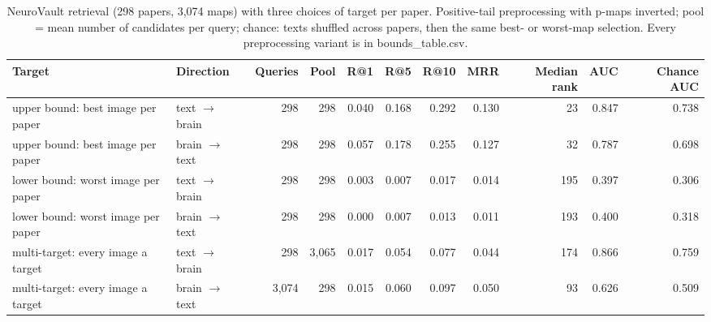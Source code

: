 \begin{table}[ht]
\centering
\scriptsize
\caption{NeuroVault retrieval (298 papers, 3,074 maps) with three choices of target per paper. Positive-tail preprocessing with p-maps inverted; pool = mean number of candidates per query; chance: texts shuffled across papers, then the same best- or worst-map selection. Every preprocessing variant is in bounds\_table.csv.}
\label{tab:neurovault_bounds}
\begin{tabular}{llrrrrrrrrr}
\toprule
Target & Direction & Queries & Pool & R@1 & R@5 & R@10 & MRR & Median rank & AUC & Chance AUC \\
\midrule
upper bound: best image per paper & text $\rightarrow$ brain & 298 & 298 & 0.040 & 0.168 & 0.292 & 0.130 & 23 & 0.847 & 0.738 \\
upper bound: best image per paper & brain $\rightarrow$ text & 298 & 298 & 0.057 & 0.178 & 0.255 & 0.127 & 32 & 0.787 & 0.698 \\
lower bound: worst image per paper & text $\rightarrow$ brain & 298 & 298 & 0.003 & 0.007 & 0.017 & 0.014 & 195 & 0.397 & 0.306 \\
lower bound: worst image per paper & brain $\rightarrow$ text & 298 & 298 & 0.000 & 0.007 & 0.013 & 0.011 & 193 & 0.400 & 0.318 \\
multi-target: every image a target & text $\rightarrow$ brain & 298 & 3,065 & 0.017 & 0.054 & 0.077 & 0.044 & 174 & 0.866 & 0.759 \\
multi-target: every image a target & brain $\rightarrow$ text & 3,074 & 298 & 0.015 & 0.060 & 0.097 & 0.050 & 93 & 0.626 & 0.509 \\
\bottomrule
\end{tabular}
\end{table}

